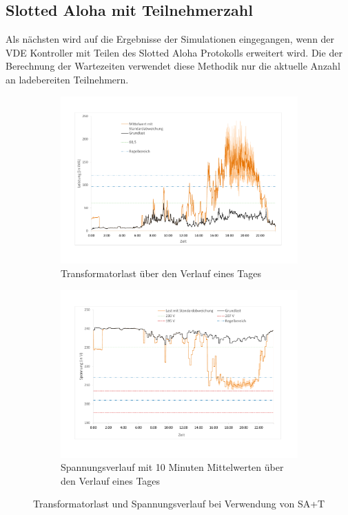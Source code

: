 \subsection{Slotted Aloha mit Teilnehmerzahl}
\label{chap_SApar}
Als nächsten wird auf die Ergebnisse der Simulationen eingegangen, wenn der VDE Kontroller mit Teilen des Slotted Aloha Protokolls erweitert wird. Die der Berechnung der Wartezeiten verwendet diese Methodik nur die aktuelle Anzahl an ladebereiten Teilnehmern.\\
\begin{figure}
	\begin{subfigure}{\linewidth}
		\includegraphics[scale=0.45]{img/SA_par/TrafoLast3.pdf}
		\caption{Transformatorlast über den Verlauf eines Tages}
		\label{Abb_SAparTrafoLast}
	\end{subfigure}
	\begin{subfigure}{\linewidth}
		\includegraphics[scale=0.45]{img/SA_par/Voltage4.pdf}
		\caption{Spannungsverlauf mit 10 Minuten Mittelwerten über den Verlauf eines Tages}
		\label{Abb_SAparSpannung}
	\end{subfigure}
	\caption{Transformatorlast und Spannungsverlauf bei Verwendung von SA+T}
\end{figure}

